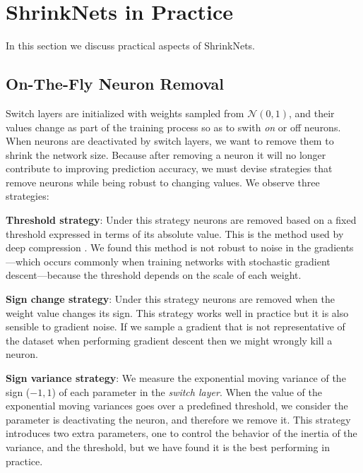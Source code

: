 \section{ShrinkNets in Practice}

In this section we discuss practical aspects of ShrinkNets.


\subsection{On-The-Fly Neuron Removal}
\label{neuron_killing}

Switch layers are initialized with weights sampled from $\mathcal{N}(0,1)$, and
their values change as part of the training process so as to swith \emph{on} or
{off} neurons. When neurons are deactivated by switch layers, we want to remove
them to shrink the network size. Because after removing a neuron it will no
longer contribute to improving prediction accuracy, we must devise strategies
that remove neurons while being robust to changing values. We observe three
strategies:

\textbf{Threshold strategy}: Under this strategy neurons are removed based on a
fixed threshold expressed in terms of its absolute value. This is the method
used by deep compression \cite{}. We found this method is not robust to noise in
the gradients---which occurs commonly when training networks with stochastic
gradient descent---because the threshold depends on the scale of each weight.

\textbf{Sign change strategy}: Under this strategy neurons are removed when the
weight value changes its sign. This strategy works well in practice but it is
also sensible to gradient noise.  If
we sample a gradient that is not representative of the dataset when performing
gradient descent then we might wrongly kill a neuron.

\textbf{Sign variance strategy}: We measure the exponential moving variance of
the sign ($-1, 1$) of each parameter in the \textit{switch layer}. When the
value of the exponential moving variances goes over a predefined threshold, we
consider the parameter is deactivating the neuron, and therefore we remove it.
This strategy introduces two extra parameters, one to control the behavior of
the inertia of the variance, and the threshold, but we have found it is the
best performing in practice.


